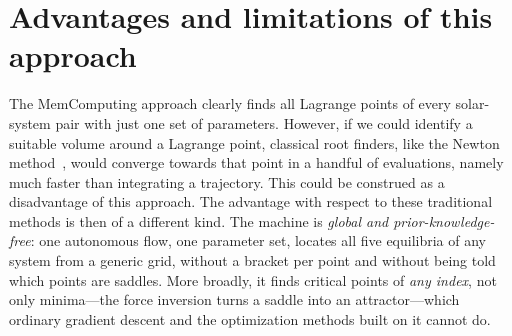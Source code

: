 \documentclass[aip,preprint,amsmath,amssymb,floatfix]{revtex4-2}
\begin{document}
\section{Advantages and limitations of this approach}\label{sec:discussion}


The MemComputing approach clearly finds all Lagrange points of every solar-system pair with just one set
of parameters. However, if we could identify a suitable volume around a Lagrange point, classical root finders, like the Newton method~\cite{sauer2018numerical},
would converge towards that point in a handful of evaluations, namely much faster than integrating a trajectory. This could be construed as a disadvantage
of this approach. The advantage with respect to
these traditional methods is then of a
different kind. The machine is \emph{global and prior-knowledge-free}: one autonomous
flow, one parameter set, locates all five equilibria of any system from a generic
grid, without a bracket per point and without being told which points are saddles.
More broadly, it finds critical points of \emph{any index}, not only minima---the
force inversion turns a saddle into an attractor---which ordinary gradient descent
and the optimization methods built on it cannot do.
\end{document}
